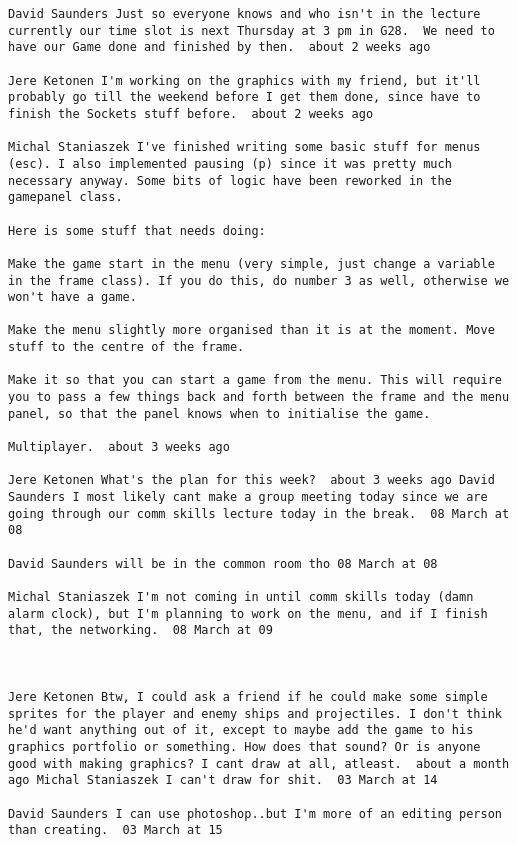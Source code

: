 \begin{verbatim}
David Saunders Just so everyone knows and who isn't in the lecture
currently our time slot is next Thursday at 3 pm in G28.  We need to
have our Game done and finished by then.  about 2 weeks ago

Jere Ketonen I'm working on the graphics with my friend, but it'll
probably go till the weekend before I get them done, since have to
finish the Sockets stuff before.  about 2 weeks ago

Michal Staniaszek I've finished writing some basic stuff for menus
(esc). I also implemented pausing (p) since it was pretty much
necessary anyway. Some bits of logic have been reworked in the
gamepanel class.

Here is some stuff that needs doing:

Make the game start in the menu (very simple, just change a variable
in the frame class). If you do this, do number 3 as well, otherwise we
won't have a game.

Make the menu slightly more organised than it is at the moment. Move
stuff to the centre of the frame.

Make it so that you can start a game from the menu. This will require
you to pass a few things back and forth between the frame and the menu
panel, so that the panel knows when to initialise the game.

Multiplayer.  about 3 weeks ago

Jere Ketonen What's the plan for this week?  about 3 weeks ago David
Saunders I most likely cant make a group meeting today since we are
going through our comm skills lecture today in the break.  08 March at
08

David Saunders will be in the common room tho 08 March at 08

Michal Staniaszek I'm not coming in until comm skills today (damn
alarm clock), but I'm planning to work on the menu, and if I finish
that, the networking.  08 March at 09



Jere Ketonen Btw, I could ask a friend if he could make some simple
sprites for the player and enemy ships and projectiles. I don't think
he'd want anything out of it, except to maybe add the game to his
graphics portfolio or something. How does that sound? Or is anyone
good with making graphics? I cant draw at all, atleast.  about a month
ago Michal Staniaszek I can't draw for shit.  03 March at 14

David Saunders I can use photoshop..but I'm more of an editing person
than creating.  03 March at 15


\end{verbatim}
